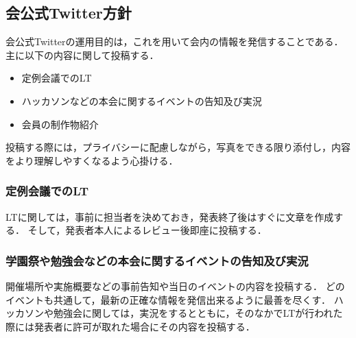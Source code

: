 \subsection*{会公式Twitter方針}



会公式Twitterの運用目的は，これを用いて会内の情報を発信することである．主に以下の内容に関して投稿する．
\begin{itemize}
\item 定例会議でのLT
\item ハッカソンなどの本会に関するイベントの告知及び実況
\item 会員の制作物紹介
\end{itemize}

投稿する際には，プライバシーに配慮しながら，写真をできる限り添付し，内容をより理解しやすくなるよう心掛ける．

\subsubsection*{定例会議でのLT}
LTに関しては，事前に担当者を決めておき，発表終了後はすぐに文章を作成する．
そして，発表者本人によるレビュー後即座に投稿する．

\subsubsection*{学園祭や勉強会などの本会に関するイベントの告知及び実況}
開催場所や実施概要などの事前告知や当日のイベントの内容を投稿する．
どのイベントも共通して，最新の正確な情報を発信出来るように最善を尽くす．
ハッカソンや勉強会に関しては，実況をするとともに，そのなかでLTが行われた際には発表者に許可が取れた場合にその内容を投稿する．